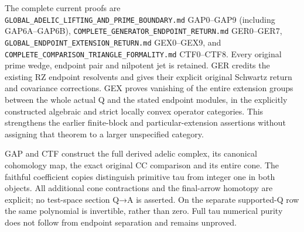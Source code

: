 The complete current proofs are
\nolinkurl{GLOBAL_ADELIC_LIFTING_AND_PRIME_BOUNDARY.md} GAP0--GAP9 (including
GAP6A--GAP6B), \nolinkurl{COMPLETE_GENERATOR_ENDPOINT_RETURN.md} GER0--GER7,
\nolinkurl{GLOBAL_ENDPOINT_EXTENSION_RETURN.md} GEX0--GEX9, and
\nolinkurl{COMPLETE_COMPARISON_TRIANGLE_FORMALITY.md} CTF0--CTF8. Every original
prime wedge, endpoint pair and nilpotent jet is retained. GER credits
the existing RZ endpoint resolvents and gives their explicit original
Schwartz return and covariance corrections. GEX proves vanishing of the
entire extension groups between the whole actual Q and the stated
endpoint modules, in the explicitly constructed algebraic and strict
locally convex operator categories. This strengthens the earlier
finite-block and particular-extension assertions without assigning that
theorem to a larger unspecified category.

GAP and CTF construct the full derived adelic complex, its canonical
cohomology map, the exact original CC comparison and its entire cone.
The faithful coefficient copies distinguish primitive tau from integer
one in both objects. All additional cone contractions and the
final-arrow homotopy are explicit; no test-space section Q→A is
asserted. On the separate supported-Q row the same polynomial is
invertible, rather than zero. Full tau numerical purity does not follow
from endpoint separation and remains unproved.
